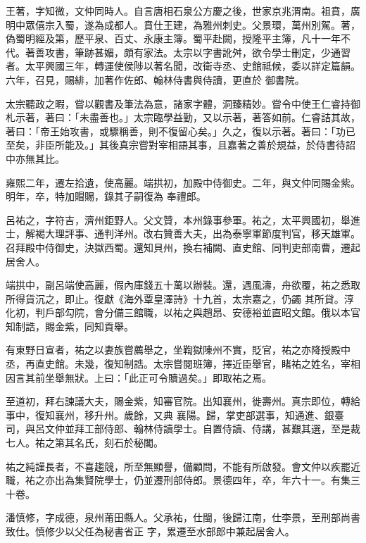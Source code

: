 \begin{pinyinscope}
 王著，字知微，文仲同時人。自言唐相石泉公方慶之後，世家京兆渭南。祖賁，廣明中眾僖宗入蜀，遂為成都人。賁仕王建，為雅州刺史。父景環，萬州別駕。著，偽蜀明經及第，歷平泉、百丈、永康主簿。蜀平赴闕，授隆平主簿，凡十一年不代。著善攻書，筆跡甚媚，頗有家法。太宗以字書訛舛，欲令學士刪定，少通習者。太平興國三年，轉運使侯陟以著名聞，改衛寺丞、史館祗候，委以詳定篇韻。六年，召見，賜緋，加著作佐郎、翰林侍書與侍讀，更直於
 御書院。



 太宗聽政之暇，嘗以觀書及筆法為意，諸家字體，洞臻精妙。嘗令中使王仁睿持御札示著，著曰：「未盡善也。」太宗臨學益勤，又以示著，著答如前。仁睿詰其故，著曰：「帝王始攻書，或驟稱善，則不復留心矣。」久之，復以示著。著曰：「功已至矣，非臣所能及。」其後真宗嘗對宰相語其事，且嘉著之善於規益，於侍書待詔中亦無其比。



 雍熙二年，遷左拾遺，使高麗。端拱初，加殿中侍御史。二年，與文仲同賜金紫。明年，卒，特加賵賜，錄其子嗣復為
 奉禮郎。



 呂祐之，字符吉，濟州鉅野人。父文贊，本州錄事參軍。祐之，太平興國初，舉進士，解褐大理評事、通判洋州。改右贊善大夫，出為泰寧軍節度判官，移天雄軍。召拜殿中侍御史，決獄西蜀。還知貝州，換右補闕、直史館、同判吏部南曹，遷起居舍人。



 端拱中，副呂端使高麗，假內庫錢五十萬以辦裝。還，遇風濤，舟欲覆，祐之悉取所得貨沉之，即止。復獻《海外覃皇澤詩》十九首，太宗嘉之，仍蠲
 其所貸。淳化初，判戶部勾院，會分備三館職，以祐之與趙昂、安德裕並直昭文館。俄以本官知制誥，賜金紫，同知貢舉。



 有東野日宣者，祐之以妻族嘗薦舉之，坐鞫獄陳州不實，貶官，祐之亦降授殿中丞，再直史館。未幾，復知制誥。太宗嘗閱班簿，擇近臣舉官，睹祐之姓名，宰相因言其前坐舉無狀。上曰：「此正可令贖過矣。」即取祐之焉。



 至道初，拜右諫議大夫，賜金紫，知審官院。出知襄州，徙壽州。真宗即位，轉給事中，復知襄州，移升州。歲餘，又典
 襄陽。歸，掌吏部選事，知通進、銀臺司，與呂文仲並拜工部侍郎、翰林侍讀學士。自置侍讀、侍講，甚艱其選，至是裁七人。祐之第其名氏，刻石於秘閣。



 祐之純謹長者，不喜趨競，所至無顯譽，備顧問，不能有所啟發。會文仲以疾罷近職，祐之亦出為集賢院學士，仍並遷刑部侍郎。景德四年，卒，年六十一。有集三十卷。



 潘慎修，字成德，泉州莆田縣人。父承祐，仕閩，後歸江南，仕李景，至刑部尚書致仕。慎修少以父任為秘書省正
 字，累遷至水部郎中兼起居舍人。




\end{pinyinscope}
